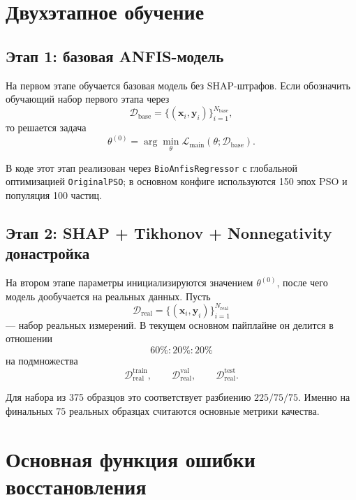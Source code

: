 \documentclass[11pt]{article}
\begin{document}
\section{Двухэтапное обучение}

\subsection{Этап 1: базовая ANFIS-модель}

На первом этапе обучается базовая модель без SHAP-штрафов. Если обозначить обучающий набор первого этапа через
\begin{equation}
\mathcal{D}_{\mathrm{base}} = \{(\mathbf{x}_i, \mathbf{y}_i)\}_{i=1}^{N_{\mathrm{base}}},
\end{equation}
то решается задача
\begin{equation}
\theta^{(0)} = \arg\min_{\theta} \mathcal{L}_{\mathrm{main}}(\theta; \mathcal{D}_{\mathrm{base}}).
\end{equation}

В коде этот этап реализован через \texttt{BioAnfisRegressor} с глобальной оптимизацией \texttt{OriginalPSO}; в основном конфиге используются 150 эпох PSO и популяция 100 частиц.

\subsection{Этап 2: SHAP + Tikhonov + Nonnegativity донастройка}

На втором этапе параметры инициализируются значением $\theta^{(0)}$, после чего модель дообучается на реальных данных. Пусть
\begin{equation}
\mathcal{D}_{\mathrm{real}} = \{(\mathbf{x}_i, \mathbf{y}_i)\}_{i=1}^{N_{\mathrm{real}}}
\end{equation}
--- набор реальных измерений. В текущем основном пайплайне он делится в отношении
\begin{equation}
60\% : 20\% : 20\%
\end{equation}
на подмножества
\begin{equation}
\mathcal{D}_{\mathrm{real}}^{\mathrm{train}},
\qquad
\mathcal{D}_{\mathrm{real}}^{\mathrm{val}},
\qquad
\mathcal{D}_{\mathrm{real}}^{\mathrm{test}}.
\end{equation}

Для набора из 375 образцов это соответствует разбиению $225/75/75$. Именно на финальных $75$ реальных образцах считаются основные метрики качества.

\section{Основная функция ошибки восстановления}
\end{document}
